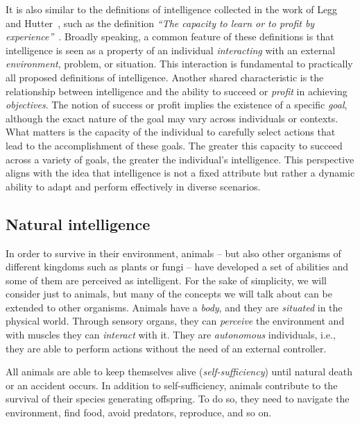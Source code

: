 It is also similar to the definitions of intelligence collected in the work of Legg and Hutter~\cite{DBLP:journals/mima/LeggH07}, such as the definition \emph{``The capacity to learn or to profit by experience''}~\cite{sternberg2000handbook}.
%
Broadly speaking, a common feature of these definitions is that intelligence is seen as a property of an individual \emph{interacting} with an external \emph{environment}, problem, or situation.
%
This interaction is fundamental to practically all proposed definitions of intelligence.
%
Another shared characteristic is the relationship between intelligence and the ability to succeed or \emph{profit} in achieving \emph{objectives}.
%
The notion of success or profit implies the existence of a specific \emph{goal}, although the exact nature of the goal may vary across individuals or contexts.
%
What matters is the capacity of the individual to carefully select actions that lead to the accomplishment of these goals.
%
The greater this capacity to succeed across a variety of goals, the greater the individual's intelligence.
%
This perspective aligns with the idea that intelligence is not a fixed attribute but rather a dynamic ability to adapt and perform effectively in diverse scenarios.


\subsection{Natural intelligence}\label{subsec:intelligence-in-nature}

In order to survive in their environment, animals -- but also other organisms of different kingdoms such as plants or fungi -- have developed a set of abilities and some of them are perceived as intelligent.
%
For the sake of simplicity, we will consider just to animals, but many of the concepts we will talk about can be extended to other organisms.
%
Animals have a \emph{body}, and they are \emph{situated} in the physical world.
%
Through sensory organs, they can \emph{perceive} the environment and with muscles they can \emph{interact} with it.
%
They are \emph{autonomous} individuals, i.e., they are able to perform actions without the need of an external controller.


All animals are able to keep themselves alive (\emph{self-sufficiency}) until natural death or an accident occurs.
%
In addition to self-sufficiency, animals contribute to the survival of their species generating offspring.
%
To do so, they need to navigate the environment, find food, avoid predators, reproduce, and so on.


